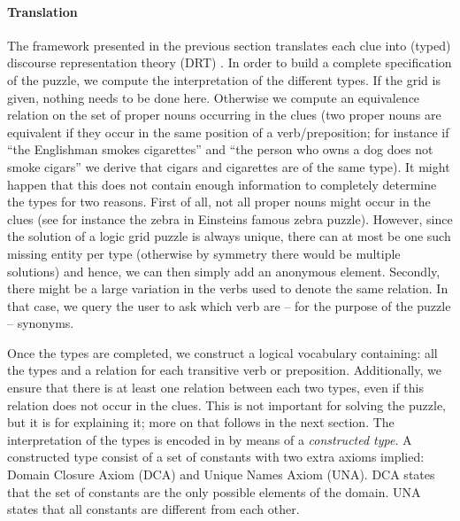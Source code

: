 \paragraph{Translation} 

The framework presented in the previous section translates each clue into (typed) discourse representation theory (DRT) \cite{}. 
In order to build a complete specification of the puzzle, we compute the interpretation of the different types. If the grid is given, nothing needs to be done here. Otherwise we compute an equivalence relation on the set of proper nouns occurring in the clues (two proper nouns are equivalent if they occur in the same position of a verb/preposition; for instance if ``the Englishman smokes cigarettes'' and ``the person who owns a dog does not smoke cigars'' we derive that cigars and cigarettes are of the same type). It might happen that this does not contain enough information to completely determine the types for two reasons. 
First of all, not all proper nouns might occur in the clues (see for instance the zebra in Einsteins famous zebra puzzle). 
However, since the solution of a logic grid puzzle is always unique, there can at most be one such missing entity per type (otherwise by symmetry there would be multiple solutions) and hence, we can then simply add an anonymous element. 
Secondly, there might be a large variation in the verbs used to denote the same relation. In that case, we query the user to ask which verb are -- for the purpose of the puzzle -- synonyms. 

Once the types are completed, we construct a logical vocabulary containing: all the types and a relation for each transitive verb or preposition.
Additionally, we ensure that there is at least one relation between each two types, even if this relation does not occur in the clues. This is not important for solving the puzzle, but it is for explaining it; more on that follows in the next section. 
The interpretation of the types is encoded in \idp by means of a \emph{constructed type}.  A constructed type consist of a set of constants with two extra axioms implied: Domain Closure Axiom (DCA) and Unique Names Axiom (UNA). DCA states that the set of constants are the only possible elements of the domain. UNA states that all constants are different from each other.


